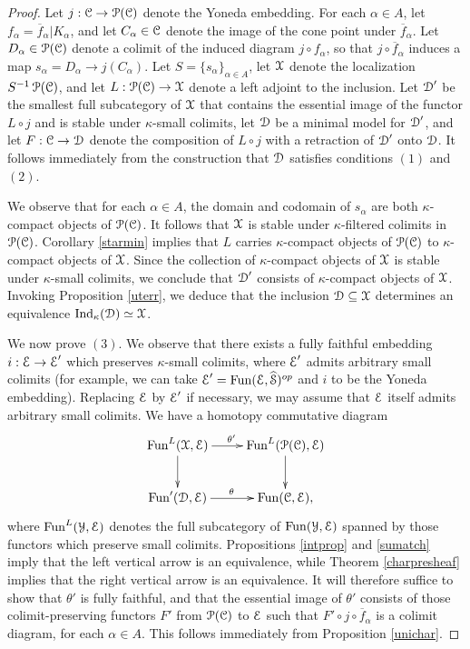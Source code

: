 \begin{proof}
Let $j: \operatorname{\mathcal{C}} \rightarrow \operatorname{\mathcal{P}}(\operatorname{\mathcal{C}})$ denote the Yoneda embedding. For each $\alpha \in A$, let
$f_{\alpha} = \overline{f}_{\alpha} | K_{\alpha}$, and let $C_{\alpha} \in \operatorname{\mathcal{C}}$ denote the image of the cone point under $\overline{f}_{\alpha}$. Let $D_{\alpha} \in \operatorname{\mathcal{P}}(\operatorname{\mathcal{C}})$ denote a colimit of the induced diagram $j \circ f_{\alpha}$, so that $j \circ \overline{f}_{\alpha}$ induces a map
$s_{\alpha} = D_{\alpha} \rightarrow j( C_{\alpha} )$. Let $S = \{ s_{\alpha} \}_{\alpha \in A}$, let $\operatorname{\mathcal{X}}$ denote the localization $S^{-1} \operatorname{\mathcal{P}}(\operatorname{\mathcal{C}})$, and let $L: \operatorname{\mathcal{P}}(\operatorname{\mathcal{C}}) \rightarrow \operatorname{\mathcal{X}}$ denote a left adjoint to the inclusion. Let $\operatorname{\mathcal{D}}'$ be the smallest full subcategory of $\operatorname{\mathcal{X}}$ that contains the essential image of the functor $L \circ j$ and is stable under $\kappa$-small colimits, let
$\operatorname{\mathcal{D}}$ be a minimal model for $\operatorname{\mathcal{D}}'$, and let $F: \operatorname{\mathcal{C}} \rightarrow \operatorname{\mathcal{D}}$ denote the composition of
$L \circ j$ with a retraction of $\operatorname{\mathcal{D}}'$ onto $\operatorname{\mathcal{D}}$. It follows immediately from the construction that $\operatorname{\mathcal{D}}$ satisfies conditions $(1)$ and $(2)$.

We observe that for each $\alpha \in A$, the domain and codomain of
$s_{\alpha}$ are both $\kappa$-compact objects of $\operatorname{\mathcal{P}}(\operatorname{\mathcal{C}})$. It follows that
$\operatorname{\mathcal{X}}$ is stable under $\kappa$-filtered colimits in $\operatorname{\mathcal{P}}(\operatorname{\mathcal{C}})$. Corollary \ref{starmin} implies that $L$ carries $\kappa$-compact objects of $\operatorname{\mathcal{P}}(\operatorname{\mathcal{C}})$ to $\kappa$-compact objects of $\operatorname{\mathcal{X}}$. 
Since the collection of $\kappa$-compact objects of $\operatorname{\mathcal{X}}$ is stable under $\kappa$-small colimits, we conclude that $\operatorname{\mathcal{D}}'$ consists of $\kappa$-compact objects of $\operatorname{\mathcal{X}}$. Invoking Proposition \ref{uterr}, we deduce that the inclusion $\operatorname{\mathcal{D}} \subseteq \operatorname{\mathcal{X}}$ determines an equivalence
$\operatorname{Ind}_{\kappa}(\operatorname{\mathcal{D}}) \simeq \operatorname{\mathcal{X}}$. 

We now prove $(3)$. We observe that there exists a fully faithful embedding $i: \operatorname{\mathcal{E}} \rightarrow \operatorname{\mathcal{E}}'$ which preserves $\kappa$-small colimits, where $\operatorname{\mathcal{E}}'$ admits arbitrary small colimits (for example, we can take $\operatorname{\mathcal{E}}' = \operatorname{Fun}( \operatorname{\mathcal{E}}, \widehat{\operatorname{\mathcal{S}}})^{op}$ and $i$ to be the Yoneda embedding).
Replacing $\operatorname{\mathcal{E}}$ by $\operatorname{\mathcal{E}}'$ if necessary, we may assume that $\operatorname{\mathcal{E}}$ itself admits arbitrary small colimits. We have a homotopy commutative diagram
$$ \xymatrix{ \Fun^{L}( \calX, \calE) \ar[r]^{\theta'} \ar[d] & \Fun^{L}( \calP(\calC), \calE) \ar[d] \\
\Fun'(\calD, \calE) \ar[r]^{\theta} & \Fun( \calC, \calE), }$$
where $\operatorname{Fun}^{L}( \operatorname{\mathcal{Y}}, \operatorname{\mathcal{E}})$ denotes the full subcategory of $\operatorname{Fun}(\operatorname{\mathcal{Y}}, \operatorname{\mathcal{E}})$ spanned by those functors which preserve small colimits. Propositions \ref{intprop} and \ref{sumatch} imply that the left vertical arrow is an equivalence, while Theorem \ref{charpresheaf} implies that the right vertical arrow is an equivalence. It will therefore suffice to show that $\theta'$ is fully faithful, and that the essential image of $\theta'$ consists of those colimit-preserving functors $F'$ from $\operatorname{\mathcal{P}}(\operatorname{\mathcal{C}})$ to $\operatorname{\mathcal{E}}$ such that $F' \circ j \circ \overline{f}_{\alpha}$ is a colimit diagram, for each $\alpha \in A$. This follows immediately from Proposition \ref{unichar}.
\end{proof}


